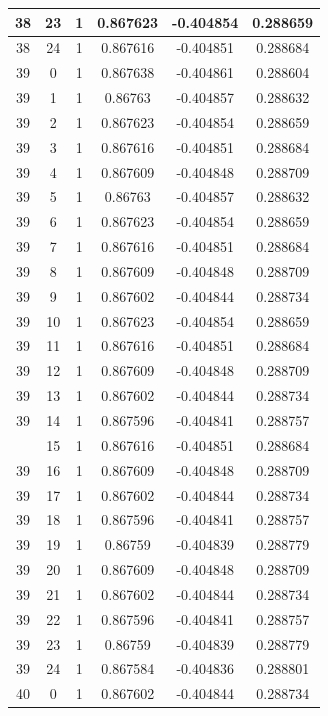 \documentclass[12pt,a4paper]{article}
\numberwithin{equation}{section}
\numberwithin{figure}{section}
\numberwithin{table}{section}
\begin{document}
\begin{longtable}{|c|c|c|c|c|c|}
38 & 23 & 1 & 0.867623 & -0.404854 & 0.288659 \\ \hline
38 & 24 & 1 & 0.867616 & -0.404851 & 0.288684 \\ \hline
39 & 0 & 1 & 0.867638 & -0.404861 & 0.288604 \\ \hline
39 & 1 & 1 & 0.86763 & -0.404857 & 0.288632 \\ \hline
39 & 2 & 1 & 0.867623 & -0.404854 & 0.288659 \\ \hline
39 & 3 & 1 & 0.867616 & -0.404851 & 0.288684 \\ \hline
39 & 4 & 1 & 0.867609 & -0.404848 & 0.288709 \\ \hline
39 & 5 & 1 & 0.86763 & -0.404857 & 0.288632 \\ \hline
39 & 6 & 1 & 0.867623 & -0.404854 & 0.288659 \\ \hline
39 & 7 & 1 & 0.867616 & -0.404851 & 0.288684 \\ \hline
39 & 8 & 1 & 0.867609 & -0.404848 & 0.288709 \\ \hline
39 & 9 & 1 & 0.867602 & -0.404844 & 0.288734 \\ \hline
39 & 10 & 1 & 0.867623 & -0.404854 & 0.288659 \\ \hline
39 & 11 & 1 & 0.867616 & -0.404851 & 0.288684 \\ \hline
39 & 12 & 1 & 0.867609 & -0.404848 & 0.288709 \\ \hline
39 & 13 & 1 & 0.867602 & -0.404844 & 0.288734 \\ \hline
39 & 14 & 1 & 0.867596 & -0.404841 & 0.288757 \\ \hline
\pagebreak
39 & 15 & 1 & 0.867616 & -0.404851 & 0.288684 \\ \hline
39 & 16 & 1 & 0.867609 & -0.404848 & 0.288709 \\ \hline
39 & 17 & 1 & 0.867602 & -0.404844 & 0.288734 \\ \hline
39 & 18 & 1 & 0.867596 & -0.404841 & 0.288757 \\ \hline
39 & 19 & 1 & 0.86759 & -0.404839 & 0.288779 \\ \hline
39 & 20 & 1 & 0.867609 & -0.404848 & 0.288709 \\ \hline
39 & 21 & 1 & 0.867602 & -0.404844 & 0.288734 \\ \hline
39 & 22 & 1 & 0.867596 & -0.404841 & 0.288757 \\ \hline
39 & 23 & 1 & 0.86759 & -0.404839 & 0.288779 \\ \hline
39 & 24 & 1 & 0.867584 & -0.404836 & 0.288801 \\ \hline
40 & 0 & 1 & 0.867602 & -0.404844 & 0.288734 \\ \hline

\end{longtable}
\end{document}
